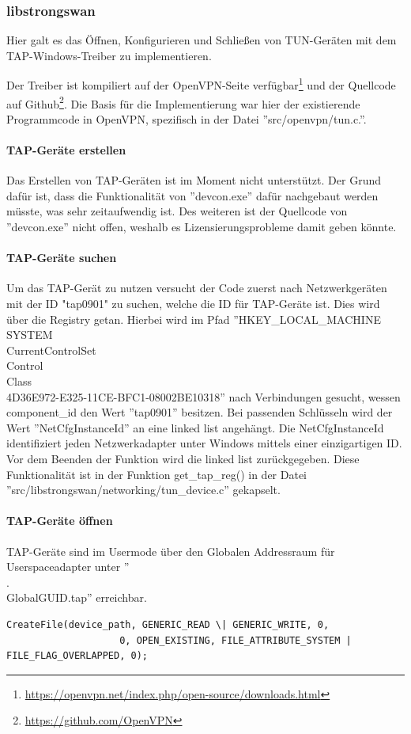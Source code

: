 \subsubsection{libstrongswan}
Hier galt es das Öffnen, Konfigurieren und Schließen von TUN-Geräten
mit dem TAP-Windows-Treiber zu implementieren.

Der Treiber ist kompiliert auf der OpenVPN-Seite
verfügbar\footnote{\url{https://openvpn.net/index.php/open-source/downloads.html}}
und der Quellcode auf Github\footnote{\url{https://github.com/OpenVPN}}.
Die Basis für die Implementierung war hier der existierende Programmcode in
OpenVPN, spezifisch in  der Datei ''src/openvpn/tun.c.''.

\paragraph{TAP-Geräte erstellen}
Das Erstellen von TAP-Geräten ist im Moment nicht unterstützt. Der Grund dafür ist,
dass die Funktionalität von ''devcon.exe'' dafür nachgebaut werden müsste, was
sehr zeitaufwendig ist. Des weiteren ist der Quellcode von ''devcon.exe'' nicht offen,
weshalb es Lizensierungsprobleme damit geben könnte.

\paragraph{TAP-Geräte suchen}
Um das TAP-Gerät zu nutzen versucht der Code zuerst nach Netzwerkgeräten mit der ID "tap0901" zu suchen,
welche die ID für TAP-Geräte ist. Dies wird über die Registry getan. Hierbei wird
im Pfad ''HKEY\_LOCAL\_MACHINE\\SYSTEM\\CurrentControlSet\\Control\\Class\\{4D36E972-E325-11CE-BFC1-08002BE10318}''
nach Verbindungen gesucht, wessen component\_id den Wert ''tap0901'' besitzen.
Bei passenden Schlüsseln wird der Wert ''NetCfgInstanceId'' an eine linked list
angehängt. Die NetCfgInstanceId identifiziert jeden Netzwerkadapter unter Windows
mittels einer einzigartigen ID.
Vor dem Beenden der Funktion wird die linked list zurückgegeben.
Diese Funktionalität ist in der Funktion get\_tap\_reg() in der Datei
''src/libstrongswan/networking/tun\_device.c'' gekapselt.


\paragraph{TAP-Geräte öffnen}
TAP-Geräte sind im Usermode über den Globalen Addressraum für Userspaceadapter
unter ''\\.\\Global\/GUID.tap'' erreichbar.
\begin{lstlisting}
CreateFile(device_path, GENERIC_READ \| GENERIC_WRITE, 0,
                    0, OPEN_EXISTING, FILE_ATTRIBUTE_SYSTEM | FILE_FLAG_OVERLAPPED, 0);
\end{lstlisting}

